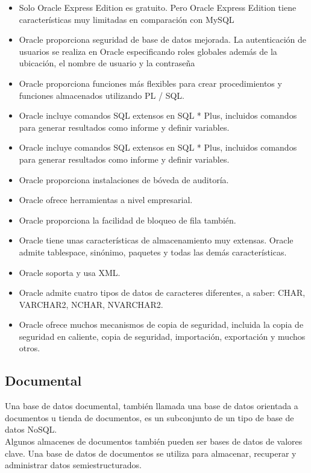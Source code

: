 \documentclass[%
 reprint,
 amsmath,amssymb,
 aps,
]{revtex4-1}
\begin{document}
\begin{itemize}
		\item Solo Oracle Express Edition es gratuito. Pero Oracle Express Edition tiene características muy limitadas en comparación con MySQL
		\item Oracle proporciona seguridad de base de datos mejorada. La autenticación de usuarios se realiza en Oracle especificando roles globales además de la ubicación, el nombre de usuario y la contraseña
		\item Oracle proporciona funciones más flexibles para crear procedimientos y funciones almacenados utilizando PL / SQL.
                     \item Oracle incluye comandos SQL extensos en SQL * Plus, incluidos comandos para generar resultados como informe y definir variables.
		\item Oracle incluye comandos SQL extensos en SQL * Plus, incluidos comandos para generar resultados como informe y definir variables.
		\item Oracle proporciona instalaciones de bóveda de auditoría.
                     \item Oracle ofrece herramientas a nivel empresarial.
		\item Oracle proporciona la facilidad de bloqueo de fila también.
		\item Oracle tiene unas características de almacenamiento muy extensas. Oracle admite tablespace, sinónimo, paquetes y todas las demás características.
                      \item Oracle soporta y usa XML.
		\item Oracle admite cuatro tipos de datos de caracteres diferentes, a saber: CHAR, VARCHAR2, NCHAR, NVARCHAR2.
		\item Oracle ofrece muchos mecanismos de copia de seguridad, incluida la copia de seguridad en caliente, copia de seguridad, importación, exportación y muchos otros.
  \end{itemize}
\subsection{Documental}
Una base de datos documental, también llamada una base de datos orientada a documentos u tienda de documentos, es un subconjunto de un tipo de base de datos NoSQL.\\

Algunos almacenes de documentos también pueden ser bases de datos de valores clave. Una base de datos de documentos se utiliza para almacenar, recuperar y administrar datos semiestructurados.\\
\end{document}
